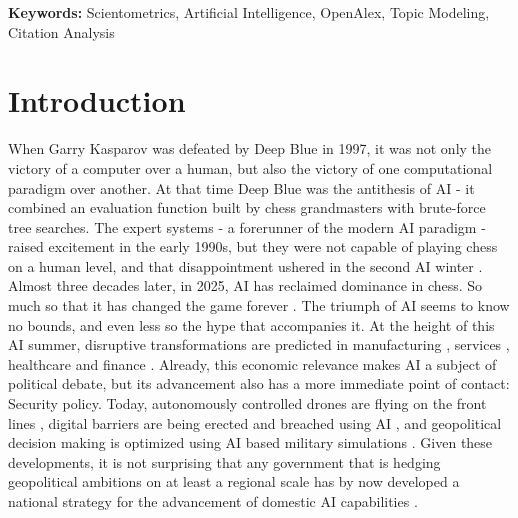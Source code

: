 \documentclass{article}
\begin{document}
	\vspace{2cm} %
	
	\begin{flushleft}
		
		\begin{center}
			\textbf{Keywords:} Scientometrics, Artificial Intelligence, OpenAlex, Topic Modeling, Citation Analysis
		\end{center}
		
		
		
	\end{flushleft}
	
	\newpage
	\thispagestyle{empty}
	\vspace*{1cm}
	
	\begin{center}
		\tableofcontents
	\end{center}
	
	\newpage
	
	
	
	\twocolumn
	
	\section{Introduction}
	\setcounter{page}{1}
	
	When Garry Kasparov was defeated by Deep Blue in 1997, it was not only the victory of a computer over a human, but also the victory of one computational paradigm over another. At that time Deep Blue was the antithesis of AI - it combined an evaluation function built by chess grandmasters with brute-force tree searches. The expert systems - a forerunner of the modern AI paradigm  - raised excitement in the early 1990s, but they were not capable of playing chess on a human level, and that disappointment ushered in the second AI winter \cite{toosi2021briefhistoryAI}. Almost three decades later, in 2025, AI has reclaimed dominance in chess. So much so that it has changed the game forever \cite{anicker2025machineschessAI}. The triumph of AI seems to know no bounds, and even less so the hype that accompanies it. At the height of this AI summer, disruptive transformations are predicted in manufacturing \cite{kim2022recent}, services \cite{huang2018artificial}, healthcare \cite{alkuwaiti2023review, fleming2018how} and finance \cite{bahoo2024artificial}. Already, this economic relevance makes AI a subject of political debate, but its advancement also has a more immediate point of contact: Security policy.  Today, autonomously controlled drones are flying on the front lines \cite{onderco2025aifrontierNATO}, digital barriers are being erected and breached using AI \cite{salem2024aicybersecurityreview, vance2023geopolitical}, and geopolitical decision making is optimized using AI based military simulations \cite{basuchoudhary2025aiwarfare}. Given these developments, it is not surprising that any government that is hedging geopolitical ambitions on at least a regional scale has by now developed a national strategy for the advancement of domestic AI capabilities \cite{sabouri2024newgeopolitics}.
	
\end{document}

